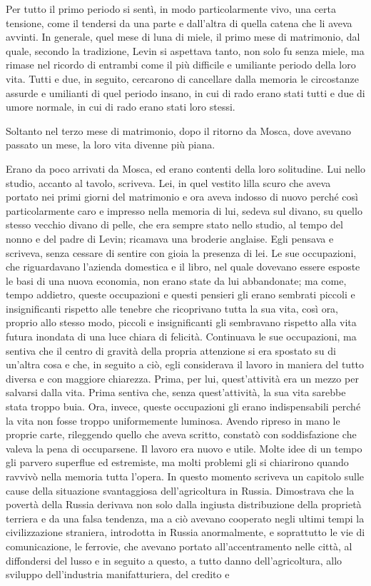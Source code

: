 Per tutto il primo periodo si sentì, in modo particolarmente vivo, una certa tensione, come il tendersi da una parte e dall'altra di quella catena che li aveva avvinti. In generale, quel mese di luna di miele, il primo mese di matrimonio, dal quale, secondo la tradizione, Levin si aspettava tanto, non solo fu senza miele, ma rimase nel ricordo di entrambi come il più difficile e umiliante periodo della loro vita. Tutti e due, in seguito, cercarono di cancellare dalla memoria le circostanze assurde e umilianti di quel periodo insano, in cui di rado erano stati tutti e due di umore normale, in cui di rado erano stati loro stessi. 

Soltanto nel terzo mese di matrimonio, dopo il ritorno da Mosca, dove avevano passato un mese, la loro vita divenne più piana. 

Erano da poco arrivati da Mosca, ed erano contenti della loro solitudine. Lui nello studio, accanto al tavolo, scriveva. Lei, in quel vestito lilla scuro che aveva portato nei primi giorni del matrimonio e ora aveva indosso di nuovo perché così particolarmente caro e impresso nella memoria di lui, sedeva sul divano, su quello stesso vecchio divano di pelle, che era sempre stato nello studio, al tempo del nonno e del padre di Levin; ricamava una broderie anglaise. Egli pensava e scriveva, senza cessare di sentire con gioia la presenza di lei. Le sue occupazioni, che riguardavano l'azienda domestica e il libro, nel quale dovevano essere esposte le basi di una nuova economia, non erano state da lui abbandonate; ma come, tempo addietro, queste occupazioni e questi pensieri gli erano sembrati piccoli e insignificanti rispetto alle tenebre che ricoprivano tutta la sua vita, così ora, proprio allo stesso modo, piccoli e insignificanti gli sembravano rispetto alla vita futura inondata di una luce chiara di felicità. Continuava le sue occupazioni, ma sentiva che il centro di gravità della propria attenzione si era spostato su di un'altra cosa e che, in seguito a ciò, egli considerava il lavoro in maniera del tutto diversa e con maggiore chiarezza. Prima, per lui, quest'attività era un mezzo per salvarsi dalla vita. Prima sentiva che, senza quest'attività, la sua vita sarebbe stata troppo buia. Ora, invece, queste occupazioni gli erano indispensabili perché la vita non fosse troppo uniformemente luminosa. Avendo ripreso in mano le proprie carte, rileggendo quello che aveva scritto, constatò con soddisfazione che valeva la pena di occuparsene. Il lavoro era nuovo e utile. Molte idee di un tempo gli parvero superflue ed estremiste, ma molti problemi gli si chiarirono quando ravvivò nella memoria tutta l'opera. In questo momento scriveva un capitolo sulle cause della situazione svantaggiosa dell'agricoltura in Russia. Dimostrava che la povertà della Russia derivava non solo dalla ingiusta distribuzione della proprietà terriera e da una falsa tendenza, ma a ciò avevano cooperato negli ultimi tempi la civilizzazione straniera, introdotta in Russia anormalmente, e soprattutto le vie di comunicazione, le ferrovie, che avevano portato all'accentramento nelle città, al diffondersi del lusso e in seguito a questo, a tutto danno dell'agricoltura, allo sviluppo dell'industria manifatturiera, del credito e 